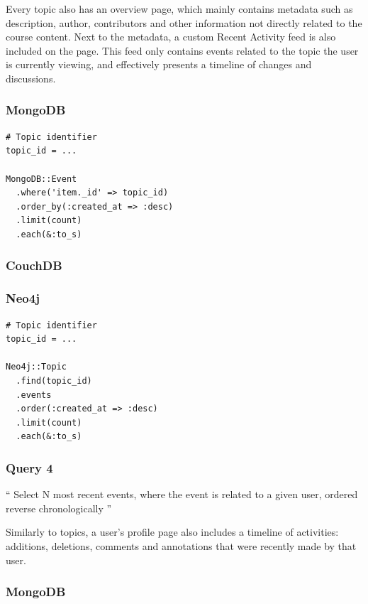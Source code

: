 Every topic also has an overview page, which mainly contains metadata such as description, author, contributors and other information not directly related to the course content.
Next to the metadata, a custom Recent Activity feed is also included on the page.
This feed only contains events related to the topic the user is currently viewing, and effectively presents a timeline of changes and discussions.

\subsubsection*{MongoDB}

\begin{verbatim}
# Topic identifier
topic_id = ...

MongoDB::Event
  .where('item._id' => topic_id)
  .order_by(:created_at => :desc)
  .limit(count)
  .each(&:to_s)
\end{verbatim}

\subsubsection*{CouchDB}


\subsubsection*{Neo4j}

\begin{verbatim}
# Topic identifier
topic_id = ...

Neo4j::Topic
  .find(topic_id)
  .events
  .order(:created_at => :desc)
  .limit(count)
  .each(&:to_s)
\end{verbatim}

\subsubsection{Query 4}
\label{subsubsec:query-4}

``
Select N most recent events, where the event is related to a given user, ordered reverse chronologically
''

Similarly to topics, a user's profile page also includes a timeline of  activities: additions, deletions, comments and annotations that were recently made by that user.

\subsubsection*{MongoDB}

